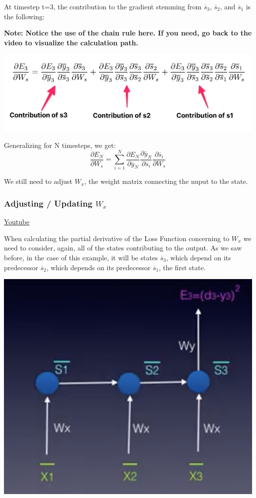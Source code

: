 At timestep t=3, the contribution to the gradient stemming from \(\overline{s}_3\), \(\overline{s}_2\), and \(\overline{s}_1\) is the following: \newline

\textbf{Note: Notice the use of the chain rule here. If you need, go back to the video to visualize the calculation path.}

\includegraphics[width=0.5\linewidth]{img//rnn//intro/bptt_eq.jpeg}

Generalizing for N timesteps, we get: \[\frac{\partial E_N}{\partial W_s} = \sum_{i=1}^N \frac{\partial E_N}{\partial \overline{y}_N} \frac{\partial \overline{y}_N}{\partial \overline{s}_i} \frac{\partial \overline{s}_i}{\partial W_s}\] 

We still need to adjust \textbf{\(W_x\)}, the weight matrix connecting the nuput to the state.

\subsubsection{Adjusting / Updating \(W_x\)}
\href{https://www.youtube.com/watch?v=uBy_eIJDD1M&ab_channel=Udacity}{Youtube} \newline

When calculating the partial derivative of the Loss Function concerning to \(W_x\) we need to consider, again, all of the states contributing to the output. As we saw before, in the case of this example, it will be states \(\overline{s}_3\), which depend on its predecessor \(\overline{s}_2\), which depends on its predecessor \(\overline{s}_1\), the first state.

\includegraphics[width=0.5\linewidth]{img//rnn//intro/screen-shot-2017-11-08-at-3.43.34-pm.png}


